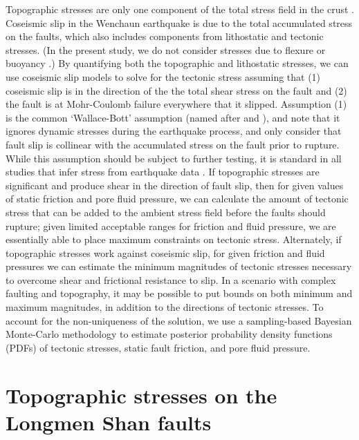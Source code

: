 \documentclass[draft,jgrga]{AGUTeX}
\begin{document}
\begin{article}
Topographic stresses are only one component of the total stress field
in the crust \citep{molnar1988}. Coseismic slip in the Wenchaun
earthquake is due to the total accumulated stress on the faults, which
also includes components from lithostatic and tectonic stresses. (In
the present study, we do not consider stresses due to flexure
\citep[e.g.,][] {luttrell2007} or buoyancy
\citep[e.g.,][]{luttrell2011}.) By quantifying both the topographic
and lithostatic stresses, we can use coseismic slip models to solve
for the tectonic stress assuming that (1) coseismic slip is in the
direction of the the total shear stress on the fault \citep[e.g.,]
[]{angelier1994} and (2) the fault is at Mohr-Coulomb failure
everywhere that it slipped.  Assumption (1) is the common
`Wallace-Bott' assumption (named after \citet{wallace1951} and
\citet{bott1959}), and note that it ignores dynamic stresses during
the earthquake process, and only consider that fault slip is collinear
with the accumulated stress on the fault prior to rupture. While this
assumption should be subject to further testing, it is standard in all
studies that infer stress from earthquake data
\citep[e.g.,][]{mckenzie1969, angelier1994, michael1987, reches1987,
  luttrell2011, medinaluna2013}.  If topographic stresses are
significant and produce shear in the direction of fault slip, then for
given values of static friction and pore fluid pressure, we can
calculate the amount of tectonic stress that can be added to the
ambient stress field before the faults should rupture; given limited
acceptable ranges for friction and fluid pressure, we are essentially
able to place maximum constraints on tectonic stress. Alternately, if
topographic stresses work against coseismic slip, for given friction
and fluid pressures we can estimate the minimum magnitudes of tectonic
stresses necessary to overcome shear and frictional resistance to
slip. In a scenario with complex faulting and topography, it may be
possible to put bounds on both minimum and maximum magnitudes, in
addition to the directions of tectonic stresses. To account for the
non-uniqueness of the solution, we use a sampling-based Bayesian
Monte-Carlo methodology to estimate posterior probability density
functions (PDFs) of tectonic stresses, static fault friction, and pore
fluid pressure.

\section{Topographic stresses on the Longmen Shan
faults}\label{topographic-stresses-on-the-longmen-shan-faults}


\end{article}
\end{document}
